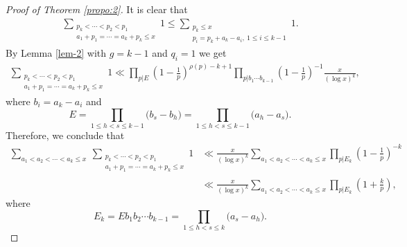 \documentclass[12pt,a4paper,reqno]{amsart}
\numberwithin{equation}{section}
\theoremstyle{plain}
\theoremstyle{definition}
\begin{document}
\begin{proof}[Proof of Theorem \ref{propo:2}]
It is clear that
\begin{align*}
\sum_{\substack{p_{k}<\cdots<p_{2}<p_{1}\\a_{1}+p_{1}=\cdots=a_{k}+p_{k}\le x}}1\le \sum_{\substack{p_k\le x\\ p_i=p_k+a_k-a_i,\ 1\le i\le k-1}}1.
\end{align*}
By Lemma \ref{lem-2} with $g=k-1$ and $q_i=1$ we get
\begin{align*}
\sum_{\substack{p_{k}<\cdots<p_{2}<p_{1}\\a_{1}+p_{1}=\cdots=a_{k}+p_{k}\le x}}1\ll \prod_{p|E}\left(1-\frac{1}{p}\right)^{\rho(p)-k+1}\prod_{p|b_1\cdots b_{k-1}}\left(1-\frac{1}{p}\right)^{-1}\frac{x}{(\log x)^{k}},
\end{align*}
where $b_i=a_k-a_i$ and 
$$
E=\prod_{1\le h<s\le k-1}\big(b_s-b_h\big)=\prod_{1\le h<s\le k-1}\big(a_h-a_s\big).
$$
Therefore, we conclude that
\begin{align}\label{eq-pro-6}
\sum_{a_{1}<a_{2}<\cdots<a_{k}\le x}~\sum_{\substack{p_{k}<\cdots<p_{2}<p_{1}\\a_{1}+p_{1}=\cdots=a_{k}+p_{k}\le x}}1&\ll \frac{x}{(\log x)^{k}}\sum_{a_{1}<a_{2}<\cdots<a_{k}\le x}\prod_{p|E_k}\left(1-\frac{1}{p}\right)^{-k}\nonumber\\
&\ll \frac{x}{(\log x)^{k}}\sum_{a_{1}<a_{2}<\cdots<a_{k}\le x}\prod_{p|E_k}\left(1+\frac{k}{p}\right),
\end{align}
where 
$$
E_k=Eb_1b_2\cdots b_{k-1}=\prod_{1\le h<s\le k}\big(a_s-a_h\big).
$$


\end{proof}
\end{document}
